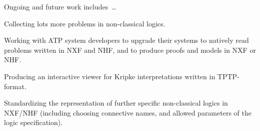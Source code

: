 \documentclass[runningheads]{llncs}
\newenvironment{packed_itemize}{
\vspace*{-0.5em}
\begin{itemize}
\setlength{\partopsep}{0pt}
\setlength{\itemsep}{1pt}
\setlength{\parskip}{0pt}
\setlength{\parsep}{0pt}
}{\end{itemize}}
\begin{document}
Ongoing and future work includes~\ldots
\begin{packed_itemize}
\item Collecting lots more problems in non-classical logics.
\item Working with ATP system developers to upgrade their systems to natively read problems 
      written in NXF and NHF, and to produce proofs and models in NXF or NHF.
\item Producing an interactive viewer for Kripke interpretations written in TPTP-format.
\item Standardizing the representation of further specific non-classical logics in NXF/NHF (including
      choosing connective names, and allowed parameters of the logic specification).
\end{packed_itemize}



\end{document}
